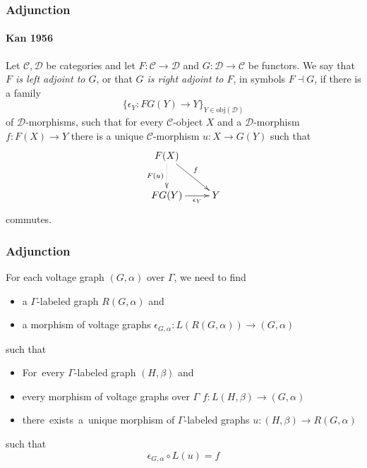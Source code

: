 \documentclass{beamer}
\newcommand{\obj}{\mathrm{obj}}
\newcommand{\C}{\mathcal{C}}
\newcommand{\D}{\mathcal{D}}
\newcommand{\isleftadjoint}{\dashv}
\begin{document}
\begin{frame}
\frametitle{Adjunction}
\framesubtitle{Kan 1956}
\begin{definition}\cite[(ii) of Theorem IV.1]{mac1998categories}
Let $\C,\D$ be categories and let $F\colon\C\to\D$ and
$G\colon\D\to\C$ be functors. We say that {\em $F$ is left adjoint to $G$},
or that {\em $G$ is right adjoint to $F$}, in symbols $F\isleftadjoint G$, 
if there is a family 
$$
\{\epsilon_Y\colon FG(Y)\to Y\}_{Y\in\obj(\D)}
$$ of $\D$-morphisms,
such that for every $\C$-object $X$ and a $\D$-morphism $f\colon F(X)\to Y$
there is a unique $\C$-morphism $u\colon X\to G(Y)$ such that 
\begin{equation*}
\xymatrix{
F(X)
	\ar[rd]^{f}
	\ar@{.>}[d]_{F(u)}
\\
FG(Y)
	\ar[r]_-{\epsilon_Y}
&
Y
}
\end{equation*}
commutes.
\end{definition}
\end{frame}
\begin{frame}
\frametitle{Adjunction}
For each voltage graph $(G,\alpha)$ over $\Gamma$, we need to find
\begin{itemize}
\item a $\Gamma$-labeled graph $R(G,\alpha)$ and
\item a morphism of voltage graphs $\epsilon_{G,\alpha}\colon L(R(G,\alpha))\to
(G,\alpha)$
\end{itemize}
such that
\begin{itemize}
\item {\color{red}For~every} $\Gamma$-labeled graph $(H,\beta)$ and
\item every morphism of voltage graphs over $\Gamma$ $f:L(H,\beta)\to (G,\alpha)$
\item {\color{red} there~exists~a~unique} morphism of $\Gamma$-labeled graphs 
$u\colon(H,\beta)\to R(G,\alpha)$
\end{itemize}
such that
\[
    \epsilon_{G,\alpha}\circ L(u)=f
\]
\end{frame}
\end{document}
